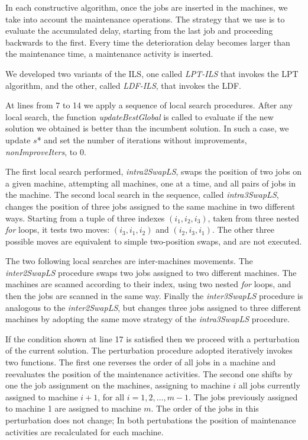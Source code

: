 \documentclass[a4paper,11pt]{article}
\begin{document}
In each constructive algorithm, once the jobs are inserted in the machines, we take into account the maintenance operations. The strategy that we use is to evaluate the accumulated delay, starting from the last job and proceeding backwards to the first. Every time the deterioration delay becomes larger than the maintenance time, a maintenance activity is inserted. 

We developed two variants of the ILS, one called \emph{LPT-ILS} that invokes the LPT algorithm, and the other, called \emph{LDF-ILS}, that invokes the LDF. 

At lines from 7 to 14 we apply a sequence of local search procedures. After any local search, the function \emph{updateBestGlobal} is called to evaluate if the new solution we obtained is better than the incumbent solution. In such a case, we update $s$* and set the number of iterations without improvements, \emph{nonImproveIters}, to 0.

The first local search performed, \emph{intra2SwapLS}, swaps the position of two jobs on a given machine, attempting all machines, one at a time, and all pairs of jobs in the machine. 
The second local search in the sequence, called \emph{intra3SwapLS}, changes the position of three jobs assigned to the same machine in two different ways. Starting from a tuple of three indexes $(i_1, i_2, i_3)$, taken from three nested \emph{for} loops, it tests two moves: $(i_3, i_1, i_2)$ and $(i_2, i_3,i_1)$. The other three possible moves are equivalent to simple two-position swaps, and are not executed. %

The two following local searches are inter-machines movements. The \emph{inter2SwapLS} procedure swaps two jobs assigned to two different machines. The machines are scanned according to their index, using two nested \emph{for} loops, and then the jobs are scanned in the same way. 
Finally the \emph{inter3SwapLS} procedure is analogous to the \emph{inter2SwapLS}, but changes three jobs assigned to three different machines by adopting the same move strategy of the \emph{intra3SwapLS} procedure. 

If the condition shown at line 17 is satisfied then we proceed with a perturbation of the current solution. The perturbation procedure adopted iteratively invokes two functions. The first one reverses the order of all jobs in a machine and reevaluates the position of the maintenance activities. The second one shifts by one the job assignment on the machines, assigning to machine $i$ all jobs currently assigned to machine $i+1$, for all $i = 1, 2, \dots, m-1$. The jobs previously assigned to machine 1 are assigned to machine $m$. The order of the jobs in this perturbation does not change; In both pertubations the position of maintenance activities are recalculated for each machine.  
\end{document}
